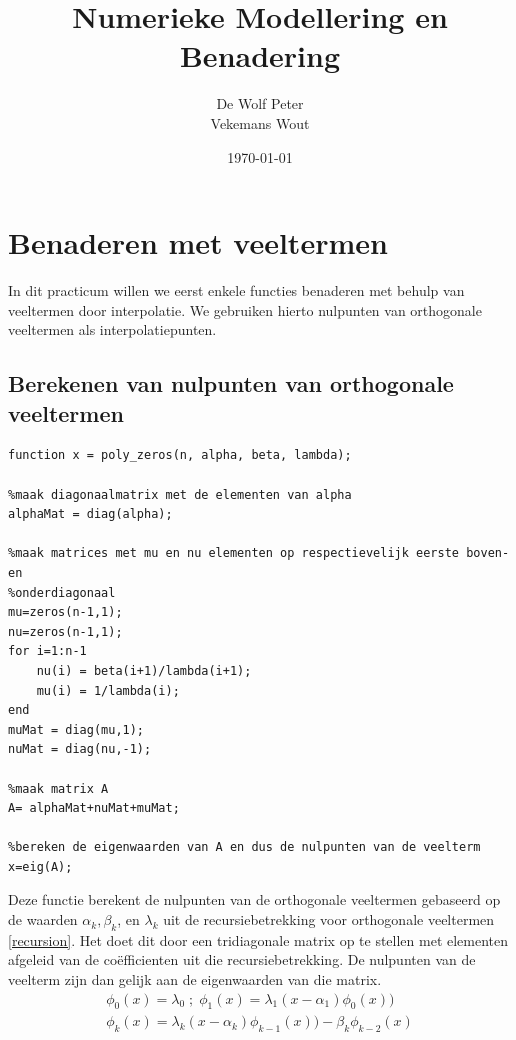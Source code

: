 \documentclass[a4paper, 12pt, titlepage]{report}
\begin{document}
\title{\textbf{Numerieke Modellering en Benadering}}
\author{De Wolf Peter\\ Vekemans Wout}

\date{\today}
\begin{titlepage}
	\maketitle
	\thispagestyle{empty}
\end{titlepage}

\newpage
\tableofcontents

\listoffigures

\newpage
\section{Benaderen met veeltermen}
In dit practicum willen we eerst enkele functies benaderen met behulp van veeltermen door interpolatie. We gebruiken hierto nulpunten van orthogonale veeltermen als interpolatiepunten.
\subsection{Berekenen van nulpunten van orthogonale veeltermen}
\begin{lstlisting}
function x = poly_zeros(n, alpha, beta, lambda);

%maak diagonaalmatrix met de elementen van alpha
alphaMat = diag(alpha);

%maak matrices met mu en nu elementen op respectievelijk eerste boven- en
%onderdiagonaal
mu=zeros(n-1,1);
nu=zeros(n-1,1);
for i=1:n-1
    nu(i) = beta(i+1)/lambda(i+1);
    mu(i) = 1/lambda(i);
end
muMat = diag(mu,1);
nuMat = diag(nu,-1);

%maak matrix A
A= alphaMat+nuMat+muMat;

%bereken de eigenwaarden van A en dus de nulpunten van de veelterm
x=eig(A);
\end{lstlisting}
Deze functie berekent de nulpunten van de orthogonale veeltermen gebaseerd op de waarden $\alpha_k, \beta_k$, en $\lambda_k$ uit de recursiebetrekking voor orthogonale veeltermen \eqref{recursion}. Het doet dit door een tridiagonale matrix op te stellen met elementen afgeleid van de co\"efficienten uit die recursiebetrekking. De nulpunten van de veelterm zijn dan gelijk aan de eigenwaarden van die matrix.\\
\begin{subequations} \label{recursion}
\begin{align}
\phi_0(x) = \lambda_0\; ;\; \phi_1(x) = \lambda_1(x-\alpha_1)\phi_0(x))\\
\phi_k(x) = \lambda_k(x-\alpha_k)\phi_{k-1}(x))-\beta_k\phi_{k-2}(x)
\end{align}
\end{subequations}
\end{document}
